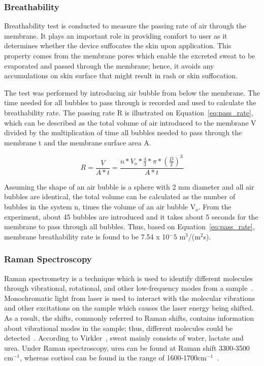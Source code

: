 \documentclass[journal]{IEEEtran}
\begin{document}
\subsubsection{Breathability} 
Breathability test is conducted to measure the passing rate of air through the membrane. It plays an important role in providing comfort to user as it determines whether the device suffocates the skin upon application. This property comes from the membrane pores which enable the excreted sweat to be evaporated and passed through the membrane; hence, it avoids any accumulations on skin surface that might result in rash or skin suffocation.

The test was performed by introducing air bubble from below the membrane. The time needed for all bubbles to pass through is recorded and used to calculate the breathability rate. The passing rate R is illustrated on Equation~\ref{eq:pass_rate}, which can be described as the total volume of air introduced to the membrane V divided by the multiplication of time all bubbles needed to pass through the membrane t and the membrane surface area A. 

\begin{equation}
    R = \frac{V}{A * t} = \frac{n * V_o * \frac{4}{3} * \pi * (\frac{D}{2})^3}{A * t}
    \label{eq:pass_rate}
\end{equation}

Assuming the shape of an air bubble is a sphere with 2 mm diameter and all air bubbles are identical, the total volume can be calculated as the number of bubbles in the system n,  times the volume of an air bubble V$_o$. From the experiment, about 45 bubbles are introduced and it takes about 5 seconds for the membrane to pass through all bubbles. Thus, based on Equation~\ref{eq:pass_rate}, membrane breathability rate is found to be 7.54 x 10$^-5$ m$^3$/(m$^2$s).

\subsubsection{Raman Spectroscopy}

Raman spectrometry is a technique which is used to identify different molecules through vibrational, rotational, and other low-frequency modes from a sample~\cite{PracticalRaman}. Monochromatic light from laser is used to interact with the molecular vibrations and other excitations on the sample which causes the laser energy being shifted. As a result, the shifts, commonly referred to Raman shifts, contains information about vibrational modes in the sample; thus, different molecules could be detected~\cite{PracticalRaman}. According to Virkler~\cite{RamanBodyFluids}, sweat mainly consists of water, lactate and urea. Under Raman spectroscopy, urea can be found at Raman shift 3300-3500 cm$^{-1}$, whereas cortisol can be found in the range of 1600-1700cm$^{-1}$~\cite{CortisolRaman}.
\end{document}
